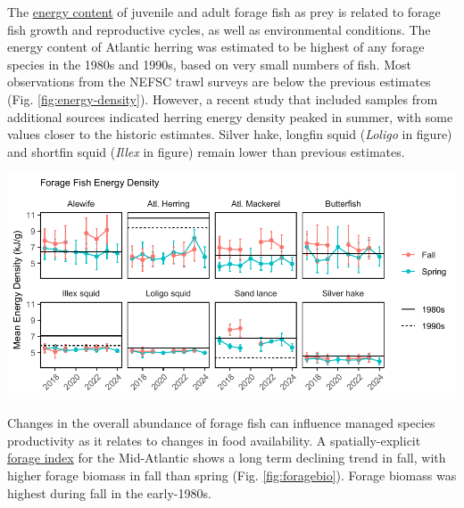 \documentclass[
  10pt,
]{article}
\let\origfigure\figure
\let\endorigfigure\endfigure
\renewenvironment{figure}[1][2] {
    \expandafter\origfigure\expandafter[H]
} {
    \endorigfigure
}
\begin{document}
The \href{https://noaa-edab.github.io/catalog/energy_density.html}{energy content} of juvenile and adult forage fish as prey is related to forage fish growth and reproductive cycles, as well as environmental conditions. The energy content of Atlantic herring was estimated to be highest of any forage species in the 1980s and 1990s, based on very small numbers of fish. Most observations from the NEFSC trawl surveys are below the previous estimates (Fig. \ref{fig:energy-density}). However, a recent study that included samples from additional sources indicated herring energy density peaked in summer, with some values closer to the historic estimates. Silver hake, longfin squid (\emph{Loligo} in figure) and shortfin squid (\emph{Illex} in figure) remain lower than previous estimates.

\begin{figure}

{\centering \includegraphics{midatlantic_files/figure-latex/energy-density-1} 

}

\caption{Energy density (mean and standard deviation) of eight forage species from NEFSC bottom trawl surveys by season and year, compared with limited data available from the 1980s (solid line) and 1990s (dashed line)}\label{fig:energy-density}
\end{figure}

Changes in the overall abundance of forage fish can influence managed species productivity as it relates to changes in food availability. A spatially-explicit \href{https://noaa-edab.github.io/catalog/forage_index.html}{forage index} for the Mid-Atlantic shows a long term declining trend in fall, with higher forage biomass in fall than spring (Fig. \ref{fig:foragebio}). Forage biomass was highest during fall in the early-1980s.
\end{document}
